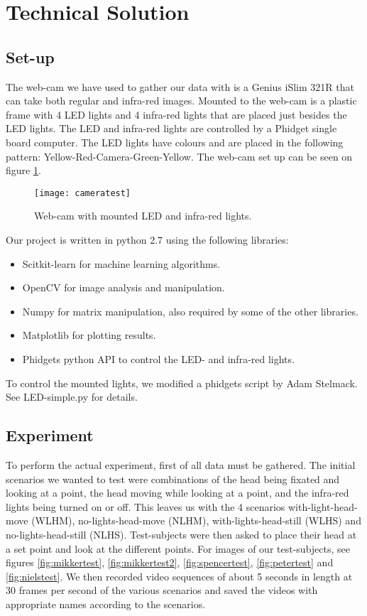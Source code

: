 \section{Technical Solution}
\subsection{Set-up}
The web-cam we have used to gather our data with is a Genius iSlim 321R that can take both regular and infra-red images.
Mounted to the web-cam is a plastic frame with 4 LED lights and 4 infra-red lights that are placed just besides the LED lights.
The LED and infra-red lights are controlled by a Phidget single board computer. %
The LED lights have colours and are placed in the following pattern: Yellow-Red-Camera-Green-Yellow.
The web-cam set up can be seen on figure \ref{fig:webcam}.
\begin{figure}
\centering
\texttt{[image: cameratest]}
\caption{Web-cam with mounted LED and infra-red lights.}
\label{fig:webcam}
\end{figure}

Our project is written in python 2.7 using the following libraries: 
\begin{itemize} %
\item{Scitkit-learn for machine learning algorithms.}
\item{OpenCV for image analysis and manipulation.}
\item{Numpy for matrix manipulation, also required by some of the other libraries.}
\item{Matplotlib for plotting results.}
\item{Phidgets python API to control the LED- and infra-red lights.}
\end{itemize}

To control the mounted lights, we modified a phidgets script by Adam Stelmack. See LED-simple.py for details. %

\subsection{Experiment}
To perform the actual experiment, first of all data must be gathered.
The initial scenarios we wanted to test were combinations of the head being fixated and looking at a point, the head moving while looking at a point, and the infra-red lights being turned on or off.
This leaves us with the 4 scenarios with-light-head-move (WLHM), no-lights-head-move (NLHM), with-lights-head-still (WLHS) and no-lights-head-still (NLHS).
Test-subjects were then asked to place their head at a set point and look at the different points. For images of our test-subjects, see figures \ref{fig:mikkertest}, \ref{fig:mikkertest2}, \ref{fig:spencertest}, \ref{fig:petertest} and \ref{fig:nielstest}.
We then recorded video sequences of about 5 seconds in length at 30 frames per second of the various scenarios and saved the videos with appropriate names according to the scenarios.

